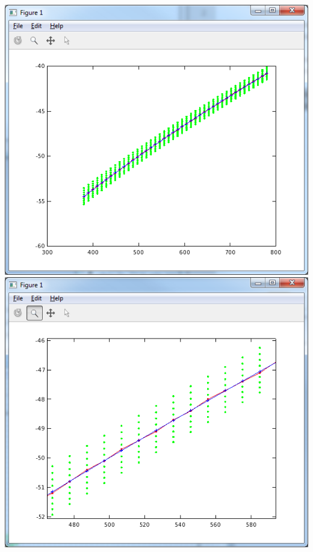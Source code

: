 \includegraphics[scale=0.5]{images/blaze2500_75.png}
\includegraphics[scale=0.5]{images/blaze2500_75_closeup1.png}
